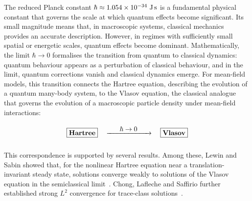 \documentclass[JEP,XML,SOM,Unicode]{cedram}
\theoremstyle{plain}
\theoremstyle{remark}
\begin{document}
The reduced Planck constant $\hbar\approx 1.054\times 10^{-34}\text{ J\,s}$ is a fundamental physical constant that governs the scale at which quantum effects become significant. Its small magnitude means that, in macroscopic systems, classical mechanics provides an accurate description. However, in regimes with sufficiently small spatial or energetic scales, quantum effects become dominant. Mathematically, the limit $\hbar\to0$ formalises the transition from quantum to classical dynamics: quantum behaviour appears as a perturbation of classical behaviour, and in the limit, quantum corrections vanish and classical dynamics emerge. For mean-field models, this transition connects the Hartree equation, describing the evolution of a quantum many-body system, to the Vlasov equation, the classical analogue that governs the evolution of a macroscopic particle density under mean-field interactions:
\begin{align*}
\vphantom{\begin{pmatrix}
1\\2\\3
\end{pmatrix}}\fbox{\text{\textbf{Hartree}}}\quad\xrightarrow{\hspace{0.6cm}\textstyle\hbar\to0\hspace{0.6cm}}\quad\fbox{\text{\textbf{Vlasov}}}
\end{align*}
This correspondence is supported by several results. Among these, Lewin and Sabin showed that, for the nonlinear Hartree equation near a translation-invariant steady state, solutions converge weakly to solutions of the Vlasov equation in the semiclassical limit~\cite{LewinSabin2020}. Chong, Lafleche and Saffirio further established strong $L^2$ convergence for trace-class solutions~\cite{ChongLaflecheSaffirio2023}.
\end{document}
